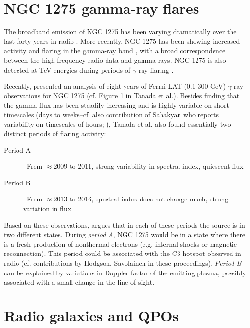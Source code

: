 \documentclass{iau}
\begin{document}
\section{NGC 1275 gamma-ray flares}

The broadband emission of NGC 1275 has been varying dramatically over the last forty years in radio \cite{Dutson2014}. More recently, NGC 1275 has been showing increased activity and flaring in the gamma-ray band \cite{Tanada2018}, with a broad correspondence between the high-frequency radio data and gamma-rays. NGC 1275 is also detected at TeV energies during periods of $\gamma$-ray flaring \cite{Aleksic2012}.

Recently, \cite{Tanada2018} presented an analysis of eight years of Fermi-LAT (0.1-300 GeV) $\gamma$-ray observations for NGC 1275 (cf. Figure 1 in Tanada et al.). Besides finding that  the gamma-flux has been steadily increasing and is highly variable on short timescales (days to weeks--cf. also contribution of Sahakyan who reports variability on timescales of hours; \cite{Baghmanyan2017}), Tanada et al. also found essentially two distinct periods of flaring activity:
\begin{description}
	\item[Period A] \ From $\approx 2009$ to 2011, strong variability in spectral index, quiescent flux
	\item[Period B] \ From $\approx 2013$ to 2016, spectral index does not change much, strong variation in flux
\end{description}
Based on these observations, \cite{Tanada2018} argues that in each of these periods the source is in two different states. During \textit{period A}, NGC 1275 would be in a state where there is a fresh production of nonthermal electrons (e.g.  internal shocks or magnetic reconnection). This period could be associated with the C3 hotspot observed in radio (cf. contributions by Hodgson, Savolainen in these proceedings). \textit{Period B} can be explained by variations in Doppler factor of the emitting plasma, possibly associated with a small change in the line-of-sight.








\section{Radio galaxies and QPOs}
\end{document}
